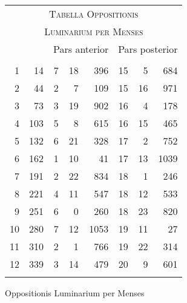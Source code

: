 %
\begin{tabnums} %
\footnotesize
\centering
\setlength{\tabcolsep}{1.0ex}
\renewcommand{\arraystretch}{1.072} %
%
\newcommand{\cwd}{3.2em}
\newcommand{\da}{{\tiny †}}
\newcommand{\db}{{\scriptsize o}}
\newcommand{\ang}{90}
\newcommand{\hsb}[1]{\footnotesize{#1}}
\newcommand{\hsa}[1]{\tiny{#1}}
%
\newcommand{\hdrB}{%
  ~ & ~ &
  \multicolumn{3}{c}{\hsb{Pars anterior}} &
  \multicolumn{3}{c}{\hsb{Pars posterior}}  
}
%
\newcommand{\hdrA}{%
  \ch{\hsa{Men-}}{\hsa{Men\-ses}} &
  \ch{\hsa{men-}}{\hsa{Dies mensium}} &
  \ch{\hsa{Feria}}{\hsa{Feria}}&
  \ch{\hsa{Hor.}}{\hsa{Hor.}} &
  \ch{\hsa{Scrup.}}{\hsa{Scrup.}} &
  \ch{\hsa{Dies}}{\hsa{Dies}} &
  \ch{\hsa{Hor.}}{\hsa{Hor.}} &
  \ch{\hsa{Scrup.}}{\hsa{Scrup.}}
}
%
\newcommand{\hdrs}{%
\hdrB \\
\cmidrule(lr){3-5} \cmidrule(lr){6-8}
\hdrA \\
}
%
\begin{tabular}[c]{@{} r r rrr rrr @{}}
\toprule
\multicolumn{8}{c}{\large\textsc{Tabella Oppositionis}} \\
\multicolumn{8}{c}{\normalsize\textsc{Luminarium per Menses}} \\
\toprule
\hdrs %
\midrule
  1 &  14 &  7 & 18 &  396 & 15 &  5 &  684 \\
  2 &  44 &  2 &  7 &  109 & 15 & 16 &  971 \\
  3 &  73 &  3 & 19 &  902 & 16 &  4 &  178 \\
  4 & 103 &  5 &  8 &  615 & 16 & 15 &  465 \\
  5 & 132 &  6 & 21 &  328 & 17 &  2 &  752 \\
  6 & 162 &  1 & 10 &   41 & 17 & 13 & 1039 \\
  7 & 191 &  2 & 22 &  834 & 18 &  1 &  246 \\
  8 & 221 &  4 & 11 &  547 & 18 & 12 &  533 \\
  9 & 251 &  6 &  0 &  260 & 18 & 23 &  820 \\
 10 & 280 &  7 & 12 & 1053 & 19 & 11 &   27 \\
 11 & 310 &  2 &  1 &  766 & 19 & 22 &  314 \\
 12 & 339 &  3 & 14 &  479 & 20 &  9 &  601 \\
\bottomrule
\addlinespace[5pt]
\end{tabular}
\caption{Oppositionis Luminarium per Menses}
\label{tab:p203b}
\end{tabnums}
